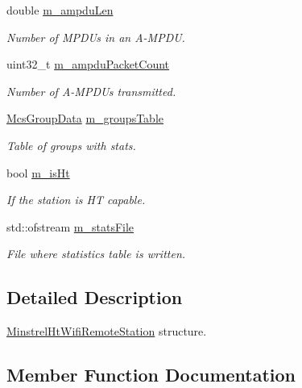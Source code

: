 \begin{DoxyCompactItemize}
double \hyperlink{structns3_1_1MinstrelHtWifiRemoteStation_a201e968c04d1b28bc843004b1d436147}{m\+\_\+ampdu\+Len}
\begin{DoxyCompactList}\small\item\em Number of M\+P\+D\+Us in an A-\/\+M\+P\+DU. \end{DoxyCompactList}\item 
uint32\+\_\+t \hyperlink{structns3_1_1MinstrelHtWifiRemoteStation_a1c341ba78d44c933fd4a13c6aef08eab}{m\+\_\+ampdu\+Packet\+Count}
\begin{DoxyCompactList}\small\item\em Number of A-\/\+M\+P\+D\+Us transmitted. \end{DoxyCompactList}\item 
\hyperlink{namespacens3_aceb821fdfc79d5a5aa23d14f85063f07}{Mcs\+Group\+Data} \hyperlink{structns3_1_1MinstrelHtWifiRemoteStation_a0d70b2b1b093ee96a27a3e29c7c14d9a}{m\+\_\+groups\+Table}
\begin{DoxyCompactList}\small\item\em Table of groups with stats. \end{DoxyCompactList}\item 
bool \hyperlink{structns3_1_1MinstrelHtWifiRemoteStation_ab8acc7b6752ecb8857a3fb9910c8d2bc}{m\+\_\+is\+Ht}
\begin{DoxyCompactList}\small\item\em If the station is HT capable. \end{DoxyCompactList}\item 
std\+::ofstream \hyperlink{structns3_1_1MinstrelHtWifiRemoteStation_a4ad1f44b846f876f6f6e65ffc7bf723d}{m\+\_\+stats\+File}
\begin{DoxyCompactList}\small\item\em File where statistics table is written. \end{DoxyCompactList}\end{DoxyCompactItemize}


\subsection{Detailed Description}
\hyperlink{structns3_1_1MinstrelHtWifiRemoteStation}{Minstrel\+Ht\+Wifi\+Remote\+Station} structure. 

\subsection{Member Function Documentation}
